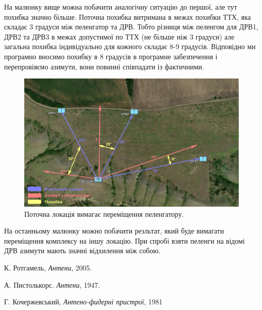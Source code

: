\documentclass{article}
\begin{document}
На малюнку вище можна побачити аналогічну ситуацію до першої, але тут похибка значно більше. Поточна похибка витримана в межах похибки ТТХ, яка складає 3 градуси між пеленгатор та ДРВ. Тобто різниця між пеленгом для ДРВ1, ДРВ2 та ДРВ3 в межах допустимої по ТТХ (не більше ніж 3 градуси) але загальна похибка індивідуально для кожного складає 8-9 градусів. Відповідно ми програмно вносимо похибку в 8 градусів в програмне забезпечення і перепровіяємо азимути, вони повинні співпадати із фактичними.


\begin{figure}[H]
	\centering
	\includegraphics[width=0.9\linewidth]{images/adjustments_not_compatible.png}
	\caption{\label{fig:tsi} Поточна локація вимагає переміщення пеленгатору.}
\end{figure}

На останньому малюнку можно побачити резльтат, який буде вимагати переміщення комплексу на іншу локацію. При спробі взяти пеленги на відомі ДРВ азимути мають значні відхилення між собою.


\begin{thebibliography}{99}

К. Ротгамель, \textit{Антени}, 2005.

А. Пистолькорс. \textit{Антени}, 1947.

Г. Кочержевський, \textit{Антено-фидерні пристрої}, 1981

\end{thebibliography}
\end{document}
